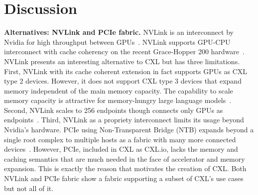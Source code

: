 \section{Discussion}
\label{aurelia:sec:discussion}
\noindent \textbf{Alternatives: NVLink and PCIe fabric.}
%
% 
NVLink is an interconnect by Nvidia for high throughput between GPUs~\cite{nvlink}. NVLink supports GPU-CPU interconnect with cache coherency on the recent Grace-Hopper 200 hardware~\cite{dgx-gh200}. 
%
NVLink presents an interesting alternative to CXL but has three limitations. 
%
First, NVLink with its cache coherent extension in fact supports GPUs as CXL type 2 devices. However, it does not support CXL type 3 devices that expand memory independent of the main memory capacity. The capability to scale memory capacity is attractive for memory-hungry large language models~\cite{gpt3:neurips:2020,llama:arxiv:2023}. 
%
Second, NVLink scales to 256 endpoints though connects only GPUs as endpoints~\cite{dgx-superpod}. 
Third, NVLink as a propriety interconnect limits its usage beyond Nvidia's hardware.
%
PCIe using Non-Transparent Bridge (NTB) expands beyond a single root complex to multiple hosts as a fabric with many more connected devices~\cite{pcie-spec}. 
%
%
%
However, PCIe, included in CXL as CXL.io, lacks the memory and caching semantics that are much needed in the face of accelerator and memory expansion. 
%
This is exactly the reason that motivates the creation of CXL.
%
Both NVLink and PCIe fabric show a fabric supporting a subset of CXL's use cases but not all of it.    
%


